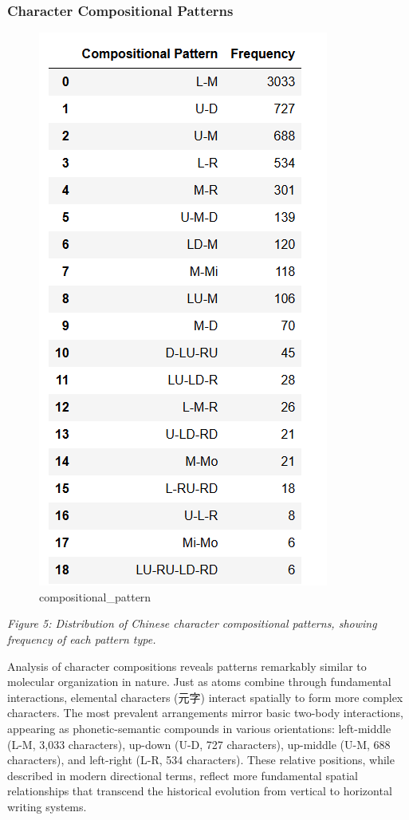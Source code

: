 \hypertarget{character-compositional-patterns}{%
\subsubsection{Character Compositional
Patterns}\label{character-compositional-patterns}}

\begin{figure}
\centering
\includegraphics{./images/app_compositional_pattern.png}
\caption{compositional\_pattern}
\end{figure}

\emph{Figure 5: Distribution of Chinese character compositional
patterns, showing frequency of each pattern type.}

Analysis of character compositions reveals patterns remarkably similar
to molecular organization in nature. Just as atoms combine through
fundamental interactions, elemental characters (元字) interact spatially
to form more complex characters. The most prevalent arrangements mirror
basic two-body interactions, appearing as phonetic-semantic compounds in
various orientations: left-middle (L-M, 3,033 characters), up-down (U-D,
727 characters), up-middle (U-M, 688 characters), and left-right (L-R,
534 characters). These relative positions, while described in modern
directional terms, reflect more fundamental spatial relationships that
transcend the historical evolution from vertical to horizontal writing
systems.

